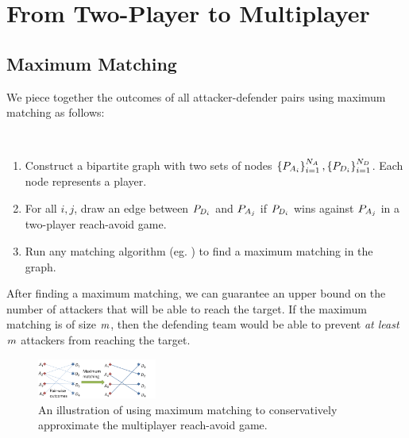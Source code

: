 \section{From Two-Player to Multiplayer} \label{sec:two_to_multi}

\subsection{Maximum Matching}
\label{subsec:max_match}
We piece together the outcomes of all attacker-defender pairs using maximum matching as follows:

\begin{alg}~
\begin{enumerate}
\item Construct a bipartite graph with two sets of nodes $\left\{P_{A_{i}}\right\}_{i=1}^{N_A},\left\{P_{D_{i}}\right\}_{i=1}^{N_D}$. Each node represents a player.
\item For all $i,j$, draw an edge between $P_{D_{i}}$ and $P_{A_{j}}$ if $P_{D_{i}}$ wins against $P_{A_{j}}$ in a two-player reach-avoid game.
\item Run any matching algorithm (eg. \cite{Schrjiver2004, Karpinski1998}) to find a maximum matching in the graph. %
\end{enumerate}
\end{alg}

After finding a maximum matching, we can guarantee an upper bound on the number of attackers that will be able to reach the target. If the maximum matching is of size $m$, then the defending team would be able to prevent \textit{at least} $m$ attackers from reaching the target.%

\begin{figure}
\centering
\includegraphics[width=0.35\textwidth]{"fig/general procedure"}
\caption{An illustration of using maximum matching to conservatively approximate the multiplayer reach-avoid game.}
\label{fig:general_procedure}
\end{figure}

